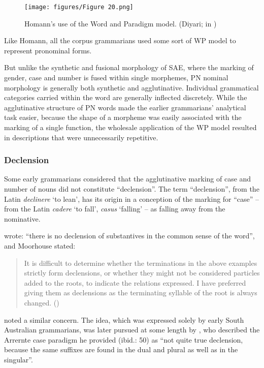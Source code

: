 \begin{figure}[t]
\texttt{[image: figures/Figure 20.png]}
\caption{Homann’s use of the Word and Paradigm model. (Diyari; in \citealt[43--44]{fraser_australian_1892})}
\label{fig:2:20}
\end{figure}

Like Homann, all the corpus grammarians used some sort of WP model to represent pronominal forms. 

But unlike the synthetic and fusional morphology of SAE, where the marking of gender, case and number is fused within single morphemes, PN nominal morphology is generally both synthetic and agglutinative. Individual grammatical categories carried within the word are generally inflected discretely. While the agglutinative structure of PN words made the earlier grammarians' analytical task easier, because the shape of a morpheme was easily associated with the marking of a single function, the wholesale application of the WP model resulted in descriptions that were unnecessarily repetitive. 

\subsubsection{Declension}
\label{sec:key:2.4.1.1}

Some early grammarians considered that the agglutinative marking of case and number of nouns did not constitute “declension''. The term “declension”, from the Latin \textit{declinere} `to lean', has its origin in a conception of the marking for “case” – from the Latin \textit{cadere} `to fall', \textit{casus} `falling' – as falling away from the nominative. 

\citet[4]{teichelmann_outlines_1840} wrote: “there is no declension of substantives in the common sense of the word”, and Moorhouse stated:

\begin{quote}
    It is difficult to determine whether the terminations in the above examples strictly form declensions, or whether they might not be considered particles added to the roots, to indicate the relations expressed. I have preferred giving them as declensions as the terminating syllable of the root is always changed. (\citealt[5]{moorhouse_vocabulary_1846})
\end{quote}

\citet[8]{taplin_grammar_1880} noted a similar concern. The idea, which was expressed solely by early South Australian grammarians, was later pursued at some length by \citet[49--50, 56]{capell_structure_1937}, who described the Arrernte case paradigm he provided (ibid.: 50) as “not quite true declension, because the same suffixes are found in the dual and plural as well as in the singular”. 

